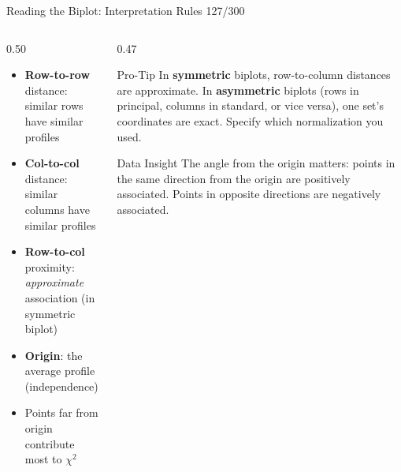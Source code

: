 \documentclass[10pt]{beamer}
\newcommand{\smark}[1]{\hfill{\scriptsize\color{codegray}#1}}
\begin{document}
\begin{frame}{Reading the Biplot: Interpretation Rules}
\smark{127/300}
\begin{columns}[T]
\begin{column}{0.50\textwidth}
\begin{itemize}
    \item \textbf{Row-to-row} distance: similar rows have similar profiles
    \item \textbf{Col-to-col} distance: similar columns have similar profiles
    \item \textbf{Row-to-col} proximity: \emph{approximate} association (in symmetric biplot)
    \item \textbf{Origin}: the average profile (independence)
    \item Points far from origin contribute most to $\chi^2$
\end{itemize}
\end{column}
\begin{column}{0.47\textwidth}
\begin{alertblock}{Pro-Tip}
    \scriptsize In \textbf{symmetric} biplots, row-to-column distances are approximate. In \textbf{asymmetric} biplots (rows in principal, columns in standard, or vice versa), one set's coordinates are exact. Specify which normalization you used.
\end{alertblock}
\vspace{0.1cm}
\begin{exampleblock}{Data Insight}
    \scriptsize The angle from the origin matters: points in the same direction from the origin are positively associated. Points in opposite directions are negatively associated.
\end{exampleblock}
\end{column}
\end{columns}
\end{frame}
\end{document}
